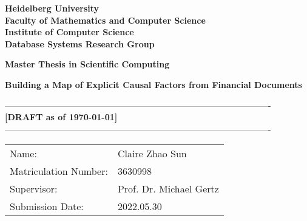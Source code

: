 \begin{titlepage}


\vspace*{1cm}
\begin{center}
\vspace*{3cm}
\textbf{ 
\Large Heidelberg University\\
\smallskip
\Large  Faculty of Mathematics and Computer Science\\
\smallskip
\Large  Institute of Computer Science\\
\smallskip
\Large Database Systems Research Group\\
\smallskip
}

\vspace{3cm}

\textbf{\large Master Thesis in Scientific Computing}  

\vspace{0.5\baselineskip}
{\huge
\textbf{Building a Map of Explicit Causal Factors from Financial Documents}
}

\vspace{0cm}
----------------------------------------------------------------------------------------------
{\huge \textbf{[DRAFT as of \today] } }
----------------------------------------------------------------------------------------------



\end{center}

\vfill 

{\large
\begin{tabular}[l]{ll}
Name: & Claire Zhao Sun\\
Matriculation Number: & 3630998\\
Supervisor: & Prof. Dr. Michael Gertz\\
Submission Date: & 2022.05.30
\end{tabular}
}

\end{titlepage}





